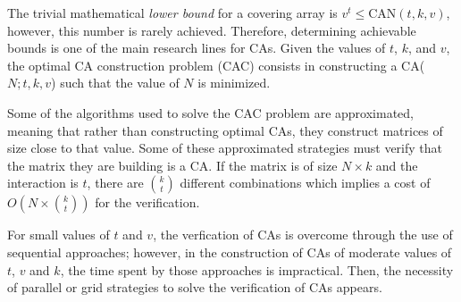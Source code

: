The trivial mathematical \textit{lower bound} for a covering array is $v^{t} \leq \text{CAN}(t, k ,v)$, however, this number is rarely achieved. Therefore, determining achievable bounds is one of the main research lines for CAs. Given the values of $t$, $k$, and $v$, the optimal CA construction problem (CAC) consists in constructing a CA($N; t, k, v$) such that the value of $N$ is minimized.

Some of the algorithms used to solve the CAC problem are approximated, meaning that rather than constructing optimal CAs, they construct matrices of size close to that value. Some of these approximated strategies must verify that the matrix they are building is a CA. If the matrix is of size $N \times k$ and the interaction is $t$, there are $\binom{k}{t}$ different combinations which implies a cost of $O(N \times \binom{k}{t})$ for the verification.

For small values of $t$ and $v$, the verfication of CAs is overcome through the use of sequential approaches; however, in the construction of CAs of moderate values of $t$, $v$ and $k$, the time spent by those approaches is impractical. Then, the necessity of parallel or grid strategies to solve the verification of CAs appears.
